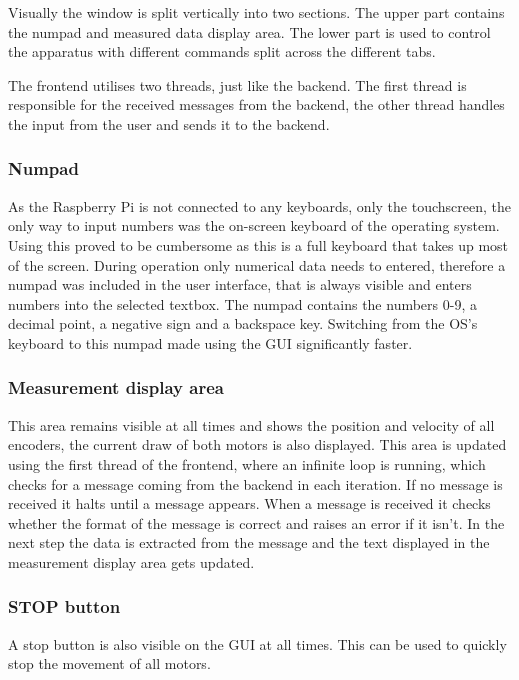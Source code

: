 \documentclass[12pt]{article}
\begin{document}
Visually the window is split vertically into two sections. The upper part contains the numpad and measured data display area. The lower part is used to control the apparatus with different commands split across the different tabs.

The frontend utilises two threads, just like the backend. The first thread is responsible for the received messages from the backend, the other thread handles the input from the user and sends it to the backend.


\subsubsection{Numpad}
As the Raspberry Pi is not connected to any keyboards, only the touchscreen, the only way to input numbers was the on-screen keyboard of the operating system. Using this proved to be cumbersome as this is a full keyboard that takes up most of the screen. During operation only numerical data needs to entered, therefore a numpad was included in the user interface, that is always visible and enters numbers into the selected textbox. The numpad contains the numbers 0-9, a decimal point, a negative sign and a backspace key. Switching from the OS's keyboard to this numpad made using the GUI significantly faster.


\subsubsection{Measurement display area}
This area remains visible at all times and shows the position and velocity of all encoders, the current draw of both motors is also displayed. This area is updated using the first thread of the frontend, where an infinite loop is running, which checks for a message coming from the backend in each iteration. If no message is received it halts until a message appears. When a message is received it checks whether the format of the message is correct and raises an error if it isn't. In the next step the data is extracted from the message and the text displayed in the measurement display area gets updated. 

\subsubsection{STOP button}
A stop button is also visible on the GUI at all times. This can be used to quickly stop the movement of all motors.
\end{document}
